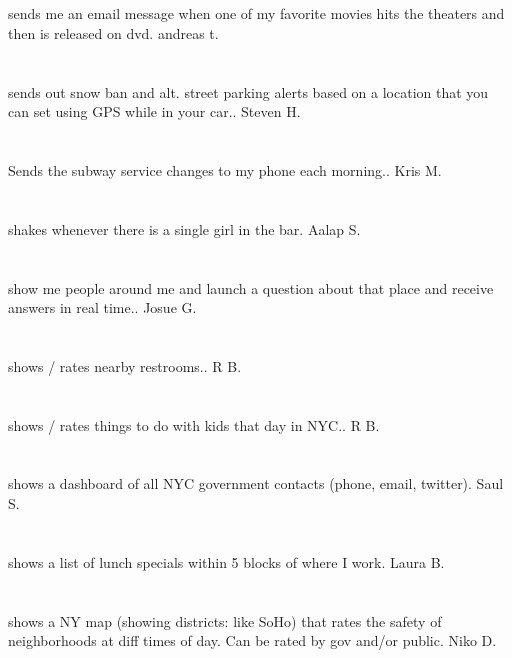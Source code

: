 \section{}sends me an email message when one of my favorite movies hits the theaters and then is released on dvd. andreas t.
\section{}sends out snow ban and alt. street parking alerts based on a location that you can set using GPS while in your car.. Steven H.
\section{}Sends the subway service changes to my phone each morning.. Kris M.
\section{}shakes whenever there is a single girl in the bar. Aalap S.
\section{}show me people around me and launch a question about that place and receive answers in real time.. Josue G.
\section{}shows / rates nearby restrooms.. R B.
\section{}shows / rates things to do with kids that day in NYC.. R B.
\section{}shows a dashboard of all NYC government contacts (phone,  email,  twitter).  Saul S.
\section{}shows a list of lunch specials within 5 blocks of where I work. Laura B.
\section{}shows a NY map (showing districts: like SoHo) that rates the safety of neighborhoods at diff times of day. Can be rated by gov and/or public. Niko D.
